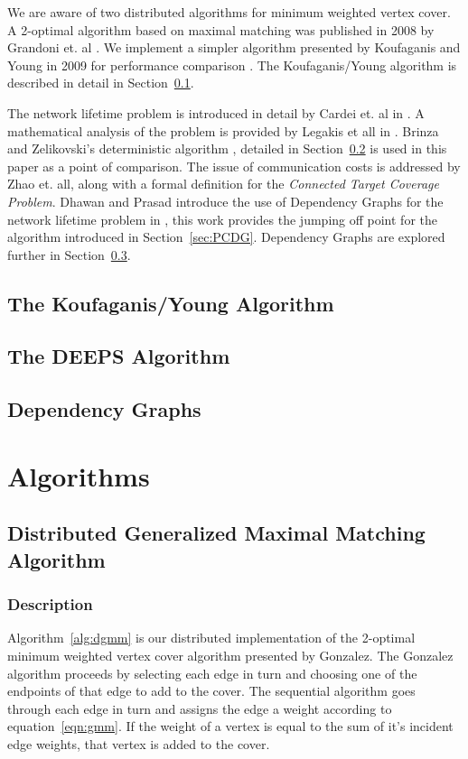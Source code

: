 We are aware of two distributed algorithms for minimum weighted vertex cover. A 2-optimal algorithm based on maximal matching was published in 2008 by Grandoni et. al \cite{1435381}. We implement a simpler algorithm presented by Koufaganis and Young in 2009 for performance comparison \cite{1582746}. The Koufaganis/Young algorithm is described in detail in Section~\ref{sec:k-y-alg}.

The network lifetime problem is introduced in detail by Cardei et. al in \cite{1498475}. A mathematical analysis of the problem is provided by Legakis et all in \cite{4697802}. Brinza and Zelikovski's deterministic algorithm \cite{1640702}, detailed in Section~\ref{sec:deeps} is used in this paper as a point of comparison. The issue of communication costs is addressed by Zhao et. all, along with a formal definition for the {\em Connected Target Coverage Problem}\cite{1514028}. Dhawan and Prasad introduce the use of Dependency Graphs for the network lifetime problem in \cite{978-3-540-77220-0_36}, this work provides the jumping off point for the algorithm introduced in Section~\ref{sec:PCDG}. Dependency Graphs are explored further in Section~\ref{sec:dep-graphs}.

\subsection{The Koufaganis/Young Algorithm}
\label{sec:k-y-alg}

\subsection{The DEEPS Algorithm}
\label{sec:deeps}

\subsection{Dependency Graphs}
\label{sec:dep-graphs}

\section{Algorithms}
\label{sec:algorithms}

\subsection{Distributed Generalized Maximal Matching Algorithm}
\subsubsection{Description}
Algorithm~\ref{alg:dgmm} is our distributed implementation of the 2-optimal minimum weighted vertex cover algorithm presented by Gonzalez.\cite{Gonzalez1995129} The Gonzalez algorithm proceeds by selecting each edge in turn and choosing one of the endpoints of that edge to add to the cover. The sequential algorithm goes through each edge in turn and assigns the edge a weight according to equation~\ref{eqn:gmm}. If the weight of a vertex is equal to the sum of it's incident edge weights, that vertex is added to the cover. 

